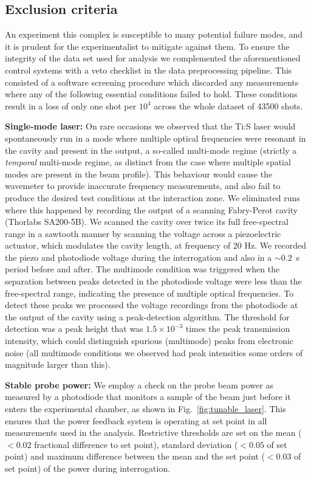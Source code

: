 \label{sec:TO_analysis}

\subsection{Exclusion criteria}

	An experiment this complex is susceptible to many potential failure modes, and it is prudent for the experimentalist to mitigate against them.
	To ensure the integrity of the data set used for analysis we complemented the aforementioned control systems with a veto checklist in the data preprocessing pipeline.
	This consisted of a software screening procedure which discarded any measurements where any of the following essential conditions failed to hold. These conditions result in a loss of only one shot per $10^{4}$ across the whole dataset of 43500 shots. 

	\textbf{Single-mode laser:}	On rare occasions we observed that the Ti:S laser would spontaneously run in a mode where multiple optical frequencies were resonant in the cavity and present in the output, a so-called multi-mode regime (strictly a \emph{temporal} multi-mode regime, as distinct from the case where multiple spatial modes are present in the beam profile). This behaviour would cause the wavemeter to provide inaccurate frequency measurements, and also fail to produce the desired test conditions at the interaction zone. We eliminated runs where this happened by recording the output of a scanning Fabry-Perot cavity (Thorlabs SA200-5B). We scanned the cavity over twice its full free-spectral range in a sawtooth manner by scanning the voltage across a piezoelectric actuator, which modulates the cavity length, at frequency of 20 Hz. 
	We recorded the piezo and photodiode voltage during the interrogation and also in a $\sim0.2$~s period before and after.
	The multimode condition was triggered when the separation between peaks detected in the photodiode voltage were less than the free-spectral range, indicating the presence of multiple optical frequencies.
	To detect these peaks we processed the voltage recordings from the photodiode at the output of the cavity using a peak-detection algorithm. The threshold for detection was a peak height that was $1.5\times10^{-3}$ times the peak transmission intensity, which could distinguish spurious (multimode) peaks from electronic noise (all multimode conditions we  observed had peak intensities some orders of magnitude larger than this).

	\textbf{Stable probe power:}		We employ a check on the probe beam power as measured by a photodiode that monitors a sample of the beam just before it enters the experimental chamber, as shown in Fig.~\ref{fig:tunable_laser}. This ensures that the power feedback system is operating at set point in all measurements used in the analysis. Restrictive thresholds are set on the mean ($<0.02$ fractional difference to set point), standard deviation ($<0.05$ of set point) and maximum difference between the mean and the set point ($<0.03$ of set point) of the power during interrogation.

